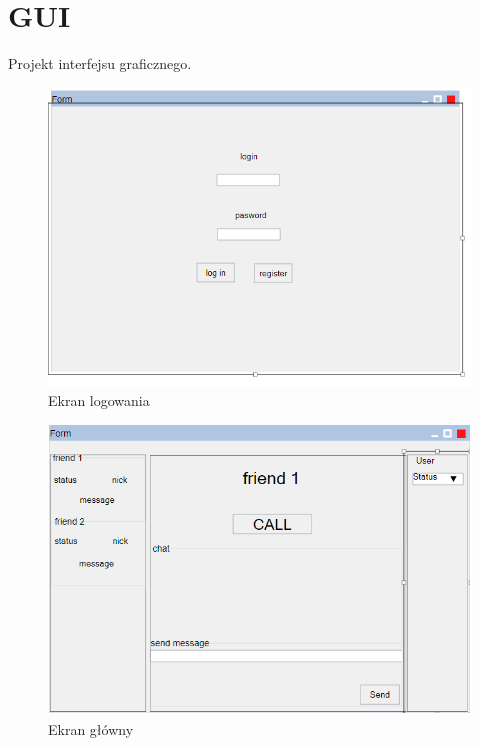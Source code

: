 \documentclass[12pt,a4paper]{article}
\begin{document}
	\pagebreak
	\section{GUI}
	\par Projekt interfejsu graficznego. 
	
	\begin{figure}[h!]
		\begin{center}
			\includegraphics*[width=.7\textwidth]{login_screen.png}
		\end{center}
		\caption{Ekran logowania}
	\end{figure}
	
	\begin{figure}[h!]
		\begin{center}
			\includegraphics*[width=.7\textwidth]{main_screen.png}
		\end{center}
		\caption{Ekran główny}
	\end{figure}
	\pagebreak
	
\end{document}
